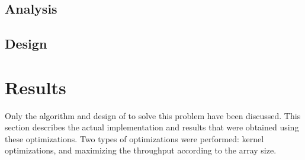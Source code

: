 \documentclass[10pt, twocolumn]{article}
\begin{document}
    \subsection{Analysis} %
    \subsection{Design} %

\section{Results} %
Only the algorithm and design of to solve this problem have been discussed.
This section describes the actual implementation and results that were obtained using these optimizations.
Two types of optimizations were performed: kernel optimizations, and maximizing the throughput according to the array size.
\end{document}
